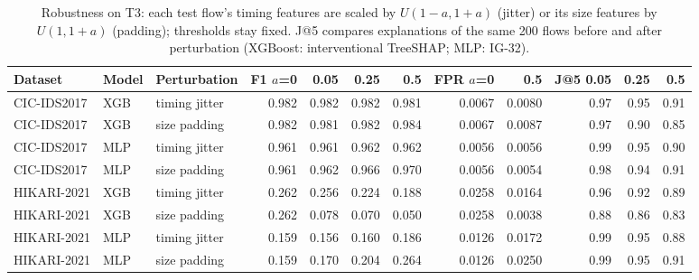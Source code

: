 \begin{table}[!htbp]
\centering
\caption{Robustness on T3: each test flow's timing features are scaled by $U(1-a, 1+a)$ (jitter) or its size features by $U(1, 1+a)$ (padding); thresholds stay fixed. J@5 compares explanations of the same 200 flows before and after perturbation (XGBoost: interventional TreeSHAP; MLP: IG-32).}
\label{tab:robust}
\scriptsize
\setlength{\tabcolsep}{3.5pt}
\begin{tabular}{lllrrrrrrrrr}
\toprule
\textbf{Dataset} & \textbf{Model} & \textbf{Perturbation} & \textbf{F1 $a$=0} & \textbf{0.05} & \textbf{0.25} & \textbf{0.5} & \textbf{FPR $a$=0} & \textbf{0.5} & \textbf{J@5 0.05} & \textbf{0.25} & \textbf{0.5} \\
\midrule
CIC-IDS2017 & XGB & timing jitter & 0.982 & 0.982 & 0.982 & 0.981 & 0.0067 & 0.0080 & 0.97 & 0.95 & 0.91 \\
CIC-IDS2017 & XGB & size padding & 0.982 & 0.981 & 0.982 & 0.984 & 0.0067 & 0.0087 & 0.97 & 0.90 & 0.85 \\
CIC-IDS2017 & MLP & timing jitter & 0.961 & 0.961 & 0.962 & 0.962 & 0.0056 & 0.0056 & 0.99 & 0.95 & 0.90 \\
CIC-IDS2017 & MLP & size padding & 0.961 & 0.962 & 0.966 & 0.970 & 0.0056 & 0.0054 & 0.98 & 0.94 & 0.91 \\
HIKARI-2021 & XGB & timing jitter & 0.262 & 0.256 & 0.224 & 0.188 & 0.0258 & 0.0164 & 0.96 & 0.92 & 0.89 \\
HIKARI-2021 & XGB & size padding & 0.262 & 0.078 & 0.070 & 0.050 & 0.0258 & 0.0038 & 0.88 & 0.86 & 0.83 \\
HIKARI-2021 & MLP & timing jitter & 0.159 & 0.156 & 0.160 & 0.186 & 0.0126 & 0.0172 & 0.99 & 0.95 & 0.88 \\
HIKARI-2021 & MLP & size padding & 0.159 & 0.170 & 0.204 & 0.264 & 0.0126 & 0.0250 & 0.99 & 0.95 & 0.91 \\
\bottomrule
\end{tabular}
\end{table}

